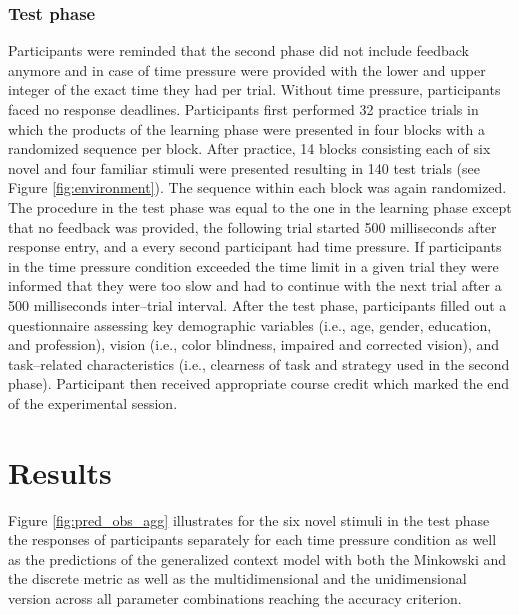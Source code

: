 \documentclass[a4paper,man,natbib]{apa6}
\begin{document}
\subsubsection{Test phase}
Participants were reminded that the second phase did not include feedback anymore and in case of time pressure were provided with the lower and upper integer of the exact time they had per trial. Without time pressure, participants faced no response deadlines. Participants first performed 32 practice trials in which the products of the learning phase were presented in four blocks with a randomized sequence per block. After practice, 14 blocks consisting each of six novel and four familiar stimuli were presented resulting in 140 test trials (see Figure \ref{fig:environment}). The sequence within each block was again randomized. The procedure in the test phase was equal to the one in the learning phase except that no feedback was provided, the following trial started 500 milliseconds after response entry, and a every second participant had time pressure. If participants in the time pressure condition exceeded the time limit in a given trial they were informed that they were too slow and had to continue with the next trial after a 500 milliseconds inter--trial interval. After the test phase, participants filled out a questionnaire assessing key demographic variables (i.e., age, gender, education, and profession), vision (i.e., color blindness, impaired and corrected vision), and task--related characteristics (i.e., clearness of task and strategy used in the second phase). Participant then received appropriate course credit which marked the end of the experimental session.

\section{Results}
Figure \ref{fig:pred_obs_agg} illustrates for the six novel stimuli in the test phase the responses of participants separately for each time pressure condition as well as the predictions of the generalized context model with both the Minkowski and the discrete metric as well as the multidimensional and the unidimensional version across all parameter combinations reaching the accuracy criterion.
\end{document}
